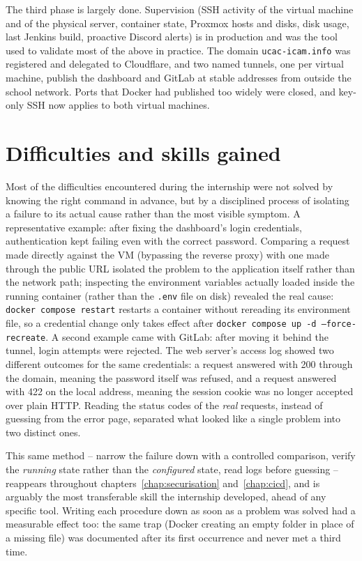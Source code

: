 The third phase is largely done. Supervision (SSH activity of the virtual machine and of the physical server, container state, Proxmox hosts and disks, disk usage, last Jenkins build, proactive Discord alerts) is in production and was the tool used to validate most of the above in practice. The domain \texttt{ucac-icam.info} was registered and delegated to Cloudflare, and two named tunnels, one per virtual machine, publish the dashboard and GitLab at stable addresses from outside the school network. Ports that Docker had published too widely were closed, and key-only SSH now applies to both virtual machines.

\section{Difficulties and skills gained}
Most of the difficulties encountered during the internship were not solved by knowing the right command in advance, but by a disciplined process of isolating a failure to its actual cause rather than the most visible symptom. A representative example: after fixing the dashboard's login credentials, authentication kept failing even with the correct password. Comparing a request made directly against the VM (bypassing the reverse proxy) with one made through the public URL isolated the problem to the application itself rather than the network path; inspecting the environment variables actually loaded inside the running container (rather than the \texttt{.env} file on disk) revealed the real cause: \texttt{docker compose restart} restarts a container without rereading its environment file, so a credential change only takes effect after \texttt{docker compose up -d --force-recreate}. A second example came with GitLab: after moving it behind the tunnel, login attempts were rejected. The web server's access log showed two different outcomes for the same credentials: a request answered with 200 through the domain, meaning the password itself was refused, and a request answered with 422 on the local address, meaning the session cookie was no longer accepted over plain HTTP. Reading the status codes of the \emph{real} requests, instead of guessing from the error page, separated what looked like a single problem into two distinct ones.

This same method -- narrow the failure down with a controlled comparison, verify the \emph{running} state rather than the \emph{configured} state, read logs before guessing -- reappears throughout chapters~\ref{chap:securisation} and~\ref{chap:cicd}, and is arguably the most transferable skill the internship developed, ahead of any specific tool. Writing each procedure down as soon as a problem was solved had a measurable effect too: the same trap (Docker creating an empty folder in place of a missing file) was documented after its first occurrence and never met a third time.

